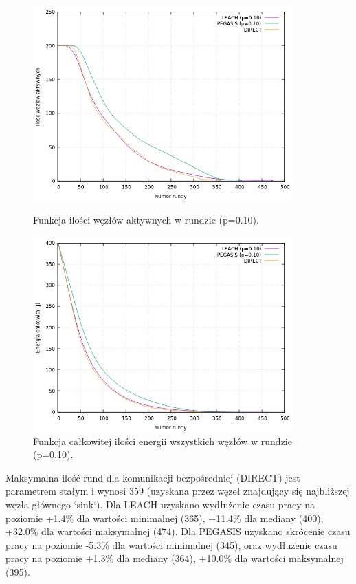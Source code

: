 \documentclass[a4paper,12pt,twoside,openany]{report}
\begin{document}
\begin{figure}[H]
 \centering
 \includegraphics[width=10cm]{images/gnuplot/test_4/nodes_in_round_p010.png}
 \caption{Funkcja ilości węzłów aktywnych w rundzie (p=0.10).}
 \includegraphics[width=10cm]{images/gnuplot/test_4/energy_in_round_p010.png}
 \caption{Funkcja całkowitej ilości energii wszystkich węzłów w rundzie (p=0.10).}
\end{figure}

\par
Maksymalna ilość rund dla komunikacji bezpośredniej (DIRECT) jest parametrem stałym i wynosi 359 (uzyskana przez węzeł znajdujący się najbliższej węzła głównego `sink`).
Dla LEACH uzyskano wydłużenie czasu pracy na poziomie +1.4\% dla wartości minimalnej (365), +11.4\% dla mediany (400), +32.0\% dla wartości maksymalnej (474).
Dla PEGASIS uzyskano skrócenie czasu pracy na poziomie -5.3\% dla wartości minimalnej (345), oraz wydłużenie czasu pracy na poziomie +1.3\% dla mediany (364), +10.0\% dla wartości maksymalnej (395).
\end{document}

